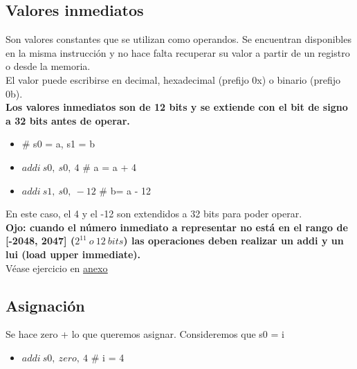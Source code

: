 \documentclass[10pt,a4paper]{article}
\begin{document}
\subsection*{Valores inmediatos}
Son valores constantes que se utilizan como operandos. Se encuentran disponibles en la misma instrucción y no hace falta recuperar su valor a partir de un registro o desde la memoria. \\
El valor puede escribirse en decimal, hexadecimal (prefijo 0x) o binario (prefijo 0b). \\
\textbf{Los valores inmediatos son de 12 bits y se extiende con el bit de signo a 32 bits antes de operar.}
\begin{itemize}
    \item \# s0 = a, s1 = b
    \item \(addi \ s0,\ s0,\ 4\) \# a = a + 4
    \item \(addi \ s1,\ s0, \ -12\) \# b= a - 12
\end{itemize}
En este caso, el 4 y el -12 son extendidos a 32 bits para poder operar. \\ 
\textbf{Ojo: cuando el número inmediato a representar no está en el rango de [-2048, 2047] ($2^{11} \ o \ 12 \ bits$) las operaciones deben realizar un addi y un lui (load upper immediate).} \\
Véase ejercicio en \hyperref[subsec:TPRVC]{\underline{anexo}}

\subsection*{Asignación}
Se hace zero + lo que queremos asignar. Consideremos que s0 = i
\begin{itemize}
    \item \(addi \ s0,\ zero,\ 4\) \# i = 4
\end{itemize}
\end{document}
